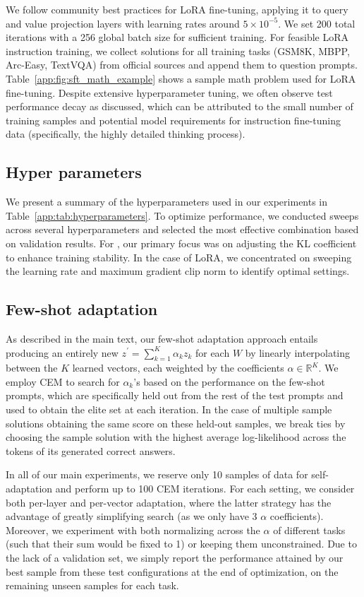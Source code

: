 We follow community best practices for LoRA fine-tuning, applying it to query and value projection layers with learning rates around $5 \times 10^{-5}$. 
We set 200 total iterations with a 256 global batch size for sufficient training. For feasible LoRA instruction training, we collect solutions for all training tasks (GSM8K, MBPP, Arc-Easy, TextVQA) from official sources and append them to question prompts. 
Table~\ref{app:fig:sft_math_example} shows a sample math problem used for LoRA fine-tuning.
Despite extensive hyperparameter tuning, we often observe test performance decay as discussed, which can be attributed to the small number of training samples and potential model requirements for instruction fine-tuning data (specifically, the highly detailed thinking process).

\subsection{Hyper parameters}
We present a summary of the hyperparameters used in our experiments in Table~\ref{app:tab:hyperparameters}. To optimize performance, we conducted sweeps across several hyperparameters and selected the most effective combination based on validation results.
For \svdacro, our primary focus was on adjusting the KL coefficient to enhance training stability. In the case of LoRA, we concentrated on sweeping the learning rate and maximum gradient clip norm to identify optimal settings.



\subsection{Few-shot adaptation}
\label{app:sec:fewshot}

As described in the main text, our few-shot adaptation approach entails producing an entirely new $z^\prime=\sum^{K}_{k=1} \alpha_k z_k$ for each $W$ by linearly interpolating between the $K$ learned \svdacro vectors, each weighted by the coefficients $\alpha \in \mathbb{R}^K$.
We employ CEM to search for $\alpha_k$'s based on the performance on the few-shot prompts, which are specifically held out from the rest of the test prompts and used to obtain the elite set at each iteration. 
In the case of multiple sample solutions obtaining the same score on these held-out samples, we break ties by choosing the sample solution with the highest average log-likelihood across the tokens of its generated correct answers.

In all of our main experiments, we reserve only 10 samples of data for self-adaptation and perform up to 100 CEM iterations. For each setting, we consider both per-layer and per-vector adaptation, where the latter strategy has the advantage of greatly simplifying search (as we only have 3 $\alpha$ coefficients). Moreover, we experiment with both normalizing across the $\alpha$ of different tasks (such that their sum would be fixed to 1) or keeping them unconstrained. Due to the lack of a validation set, we simply report the performance attained by our best sample from these test configurations at the end of optimization, on the remaining unseen samples for each task.
